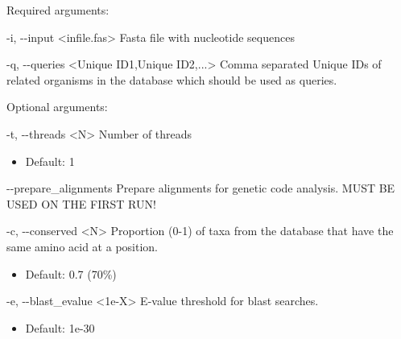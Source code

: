 \documentclass{article}
\begin{document}
\begin{description}
            \begin{description}
                \item Required arguments:
                \begin{description}
                    \item -i, -\/-input \hspace{0.2cm} <infile.fas> \hspace{0.2cm} Fasta file with nucleotide sequences
                    \item -q, -\/-queries <Unique ID1,Unique ID2,...>  Comma separated Unique IDs of related organisms in the database which should be used as queries.
                \end{description}
            \vspace{0.2cm}
                \item Optional arguments:
                \begin{description}
                    \item -t, -\/-threads \hspace{0.2cm} <N> \hspace{0.2cm} Number of threads
                    \begin{itemize}
                        \item Default: 1
                    \end{itemize}
                    \item -\/-prepare\_alignments \hspace{0.2cm} Prepare alignments for genetic code analysis. MUST BE USED ON THE FIRST RUN!
                    \item -c, -\/-conserved \hspace{0.2cm} <N> \hspace{0.2cm} Proportion (0-1) of taxa from the database that have the same amino acid at a position.
                    \begin{itemize}
                        \item Default: 0.7 (70\%)
                    \end{itemize}
                    \item -e, -\/-blast\_evalue \hspace{0.2cm} <1e-X> \hspace{0.2cm} E-value threshold for blast searches.
                    \begin{itemize}
                        \item Default: 1e-30
                    \end{itemize}

\end{description}
\end{description}
\end{description}
\end{document}
